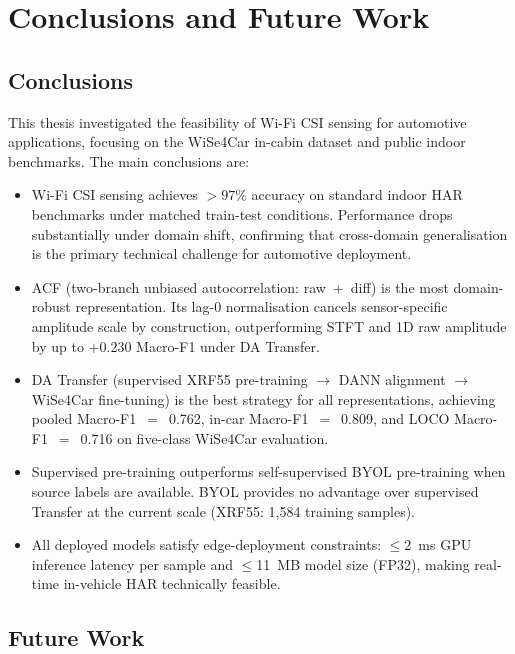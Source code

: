 \documentclass[english,bibtex]{kththesis}
\begin{document}
\cleardoublepage

\chapter{Conclusions and Future Work}
\label{ch:conclusionsAndFutureWork}

\section{Conclusions}
\label{sec:conclusions}

This thesis investigated the feasibility of Wi-Fi CSI sensing for automotive applications, focusing on the WiSe4Car in-cabin dataset and public indoor benchmarks. The main conclusions are:

\begin{itemize}
  \item Wi-Fi CSI sensing achieves $>97\%$ accuracy on standard indoor HAR benchmarks under matched train-test conditions. Performance drops substantially under domain shift, confirming that cross-domain generalisation is the primary technical challenge for automotive deployment.
  \item ACF (two-branch unbiased autocorrelation: raw~+~diff) is the most domain-robust representation. Its lag-0 normalisation cancels sensor-specific amplitude scale by construction, outperforming STFT and 1D raw amplitude by up to $+$0.230 Macro-F1 under DA Transfer.
  \item DA Transfer (supervised XRF55 pre-training $\to$ DANN alignment $\to$ WiSe4Car fine-tuning) is the best strategy for all representations, achieving pooled Macro-F1~$=$~0.762, in-car Macro-F1~$=$~0.809, and LOCO Macro-F1~$=$~0.716 on five-class WiSe4Car evaluation.
  \item Supervised pre-training outperforms self-supervised BYOL pre-training when source labels are available. BYOL provides no advantage over supervised Transfer at the current scale (XRF55: 1{,}584 training samples).
  \item All deployed models satisfy edge-deployment constraints: $\leq$2~ms GPU inference latency per sample and $\leq$11~MB model size (FP32), making real-time in-vehicle HAR technically feasible.
\end{itemize}

\section{Future Work}
\label{sec:futurework}
\end{document}
